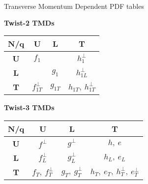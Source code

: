 \documentclass[12pt]{article}
\begin{document}
\begin{center}
{\LARGE 
Transverse Momentum Dependent PDF tables
}
\end{center}

\begin{table}[h]
\begin{center}
{\bf Twist-2 TMDs}\\\vspace{5pt}
\begin{tabular}{|c|c|c|c|}
\hline
\textbf{N/q} & \textbf{U}                                     & \textbf{L}                               & \textbf{T}                                             \\ \hline
\textbf{U}   & $f_1$                                          &                                          & $h_1^\perp$                                            \\ \hline
\textbf{L}   &                                                & $g_1$                                    & $h_{1L}^\perp$                                         \\ \hline
\textbf{T}   & {\color[HTML]{FE0000} \textbf{$f_{1T}^\perp$}} & {\color[HTML]{FE0000} \textbf{$g_{1T}$}} & {\color[HTML]{FE0000} \textbf{$h_{1T},~h_{1T}^\perp$}} \\ \hline
\end{tabular}
\end{center}
\end{table}


\begin{table}[h]
\begin{center}
{\bf Twist-3 TMDs}\\\vspace{5pt}
\begin{tabular}{|c|c|c|c|}
\hline
\textbf{N/q} & \textbf{U}                                       & \textbf{L}                                       & \textbf{T}                                                       \\ \hline
\textbf{U}   & $f^\perp$                                        & $g^\perp$                                        & $h,~e$                                                           \\ \hline
\textbf{L}   & $f_L^\perp$                                      & $g_L^\perp$                                      & $h_L,~e_L$                                                       \\ \hline
\textbf{T}   & {\color[HTML]{FE0000} \textbf{$f_T,~f_T^\perp$}} & {\color[HTML]{FE0000} \textbf{$g_T,~g_T^\perp$}} & {\color[HTML]{FE0000} \textbf{$h_T,~e_T,~h_T^\perp,~e_T^\perp$}} \\ \hline
\end{tabular}
\end{center}
\end{table}
\end{document}
